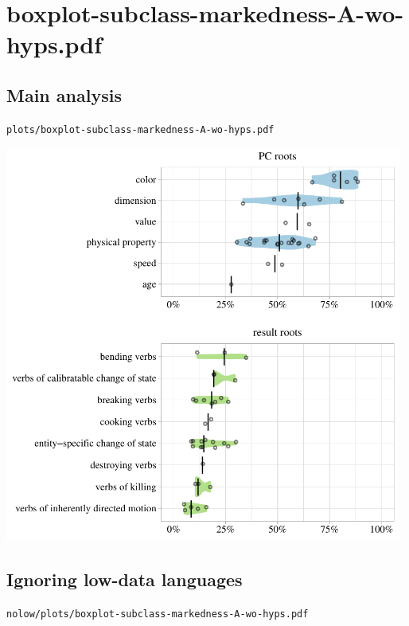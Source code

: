 \eject

\section{boxplot-subclass-markedness-A-wo-hyps.pdf}

\subsection{Main analysis}

\texttt{plots/boxplot-subclass-markedness-A-wo-hyps.pdf}

\includegraphics[width=0.98\textwidth]{../plots/boxplot-subclass-markedness-A-wo-hyps.pdf}

\subsection{Ignoring low-data languages}

\texttt{nolow/plots/boxplot-subclass-markedness-A-wo-hyps.pdf}

